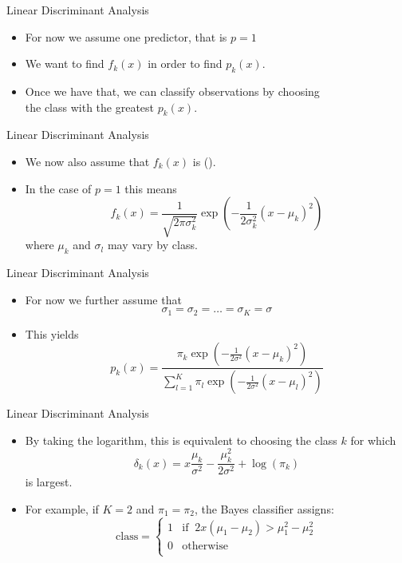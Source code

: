 \documentclass[mathserif, aspectratio=169]{beamer}
\begin{document}
\begin{frame}{Linear Discriminant Analysis}
	\begin{itemize}
		\item For now we assume one predictor, that is $p=1$
		\item We want to find $f_k(x)$ in order to find $p_k(x)$.
		\item Once we have that, we can classify observations by choosing\\
			the class with the greatest $p_k(x)$.
	\end{itemize}
\end{frame}


\begin{frame}{Linear Discriminant Analysis}
	\begin{itemize}
		\item We now also assume that $f_k(x)$ is  ().
		\item In the case of $p=1$ this means
			\[
				f_k(x) = \frac{1}{\sqrt{2\pi \sigma_k^2}}
				\exp\left(
				-\frac{1}{2\sigma_k^2}
				\left( x - \mu_k\right)^2
				\right)
			\]
		where $\mu_k$ and $\sigma_l$ may vary by class.
	\end{itemize}
	
\end{frame}

\begin{frame}{Linear Discriminant Analysis}
	\begin{itemize}
		\item For now we further assume that
			\[ \sigma_1 = \sigma_2 = \dots = \sigma_K = \sigma \]
		\item This yields
			\[
				p_k(x) =
				\frac{\pi_k
					\exp\left(
					-\frac{1}{2\sigma^2}
					\left( x - \mu_k\right)^2
					\right)
				}{\sum_{l=1}^K\pi_l
					\exp\left(
					-\frac{1}{2\sigma^2}
					\left( x - \mu_l\right)^2
					\right)
				}
			\]
	\end{itemize}
\end{frame}


\begin{frame}{Linear Discriminant Analysis}
	\begin{itemize}
		\item By taking the logarithm, this is equivalent to choosing the class $k$ for which
			\[
				\delta_k(x) =
				x \frac{\mu_k}{\sigma^2} 
				- \frac{\mu_k^2}{2\sigma^2}
				+ \log\left(\pi_k\right)
			\]
			is largest.
		\item For example, if $K=2$ and $\pi_1 = \pi_2$, the Bayes classifier
			assigns:
			\[
				\text{class} =
				\begin{cases}
					1 & \text{if}\;\; 2x(\mu_1 - \mu_2) > \mu_1^2 - \mu_2^2\\
					0 & \text{otherwise}\\
				\end{cases}
			\]
	\end{itemize}
\end{frame}
\end{document}
